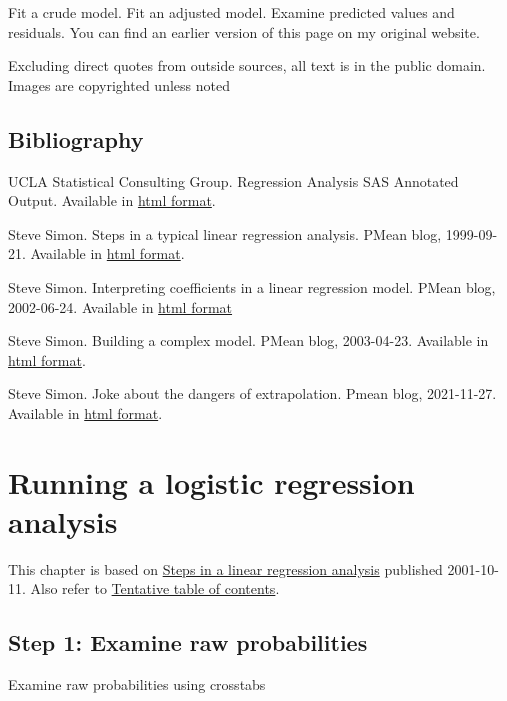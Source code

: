 \documentclass[
  letterpaper,
  DIV=11,
  numbers=noendperiod]{scrreprt}
\begin{document}
Fit a crude model. Fit an adjusted model. Examine predicted values and
residuals. You can find an earlier version of this page on my original
website.

Excluding direct quotes from outside sources, all text is in the public
domain. Images are copyrighted unless noted

\section{Bibliography}\label{bibliography-2}

UCLA Statistical Consulting Group. Regression Analysis \textbar{} SAS
Annotated Output. Available in
\href{https://stats.oarc.ucla.edu/sas/output/regression-analysis/}{html
format}.

Steve Simon. Steps in a typical linear regression analysis. PMean blog,
1999-09-21. Available in
\href{http://new.pmean.com/steps-in-linear-regression/}{html format}.

Steve Simon. Interpreting coefficients in a linear regression model.
PMean blog, 2002-06-24. Available in
\href{http://new.pmean.com/intepreting-linear-regression-coefficients/}{html
format}

Steve Simon. Building a complex model. PMean blog, 2003-04-23. Available
in \href{http://new.pmean.com/building-complex-models/}{html format}.

Steve Simon. Joke about the dangers of extrapolation. Pmean blog,
2021-11-27. Available in
\href{http://new.pmean.com/extrapolation-joke/}{html format}.


\chapter{Running a logistic regression
analysis}\label{running-a-logistic-regression-analysis}

This chapter is based on
\href{http://new.pmean.com/steps-in-linear-regression/}{Steps in a
linear regression analysis} published 2001-10-11. Also refer to
\href{http://www.pmean.com/10/Contents.html}{Tentative table of
contents}.

\section{Step 1: Examine raw
probabilities}\label{step-1-examine-raw-probabilities}

Examine raw probabilities using crosstabs
\end{document}
